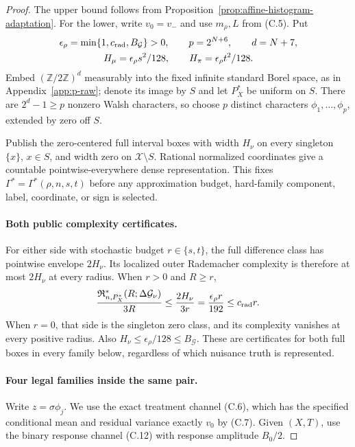\begin{proof}
The upper bound follows from
Proposition~\ref{prop:affine-histogram-adaptation}. For the lower, write
$v_0=v_-$ and use $m_\rho,L$ from (C.5). Put
\[
 \begin{gathered}
 \epsilon_\rho=\min\{1,c_{\rm rad},B_{\mathcal G}\}>0,\qquad
 p=2^{N+6},\qquad d=N+7,\\
 H_\mu=\epsilon_\rho s^2/128,\qquad
 H_\pi=\epsilon_\rho t^2/128.
 \end{gathered}
\]
Embed $(\mathbb Z/2\mathbb Z)^d$ measurably into the fixed infinite
standard Borel space, as in Appendix~\ref{app:p-raw}; denote its image
by $S$ and let $P_X^*$ be uniform on $S$. There are $2^d-1\ge p$
nonzero Walsh characters, so choose $p$ distinct characters
$\phi_1,\ldots,\phi_p$, extended by zero off $S$.

Publish the zero-centered full interval boxes with width $H_\nu$ on
every singleton $\{x\}$, $x\in S$, and width zero on $\mathcal X\setminus S$.
Rational normalized coordinates give a countable pointwise-everywhere
dense representation. This fixes $\Gamma^*=\Gamma^*(\rho,n,s,t)$
before any approximation budget, hard-family component, label,
coordinate, or sign is selected.

\paragraph{Both public complexity certificates.}
For either side with stochastic budget $r\in\{s,t\}$, the full
difference class has pointwise envelope $2H_\nu$. Its localized outer
Rademacher complexity is therefore at most $2H_\nu$ at every radius.
When $r>0$ and $R\ge r$,
\[
 \frac{\mathfrak R^*_{n,P_X^*}(R;\Delta\mathcal G_\nu)}{3R}
 \le\frac{2H_\nu}{3r}
 =\frac{\epsilon_\rho r}{192}\le c_{\rm rad}r.
\]
When $r=0$, that side is the singleton zero class, and its complexity
vanishes at every positive radius. Also
$H_\nu\le\epsilon_\rho/128\le B_{\mathcal G}$. These are certificates
for both full boxes in every family below, regardless of which
nuisance truth is represented.

\paragraph{Four legal families inside the same pair.}
Write $z=\sigma\phi_j$. We use the exact treatment channel (C.6),
which has the specified conditional mean and residual variance exactly
$v_0$ by (C.7). Given $(X,T)$, use the binary response channel (C.12)
with response amplitude $B_0/2$.


\end{proof}
